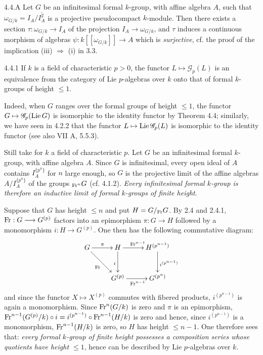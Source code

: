 \begin{remark}{4.4.A}\label{VIIB.4.4.A}
Let $G$ be an infinitesimal formal $k$-group, with affine algebra $A$, such that $\omega_{G/k}=I_A/\overline{I_A^2}$ is a projective pseudocompact $k$-module. Then there exists a section $\tau:\omega_{G/k}\to I_A$ of the projection $I_A\to\omega_{G/k}$, and $\tau$ induces a continuous morphism of algebras $\psi:k[[\omega_{G/k}]]\to A$ which is \emph{surjective}, cf. the proof of the implication (iii) $\Rightarrow$ (i) in 3.3.
\end{remark}
\begin{corollary}{4.4.1}\label{VIIB.4.4.1}
If $k$ is a field of characteristic $p>0$, the functor $L\mapsto\mathscr G_p(L)$ is an equivalence from the category of Lie $p$-algebras over $k$ onto that of formal $k$-groups of height $\le1$.
\end{corollary}
Indeed, when $G$ ranges over the formal groups of height $\le1$, the functor $G\mapsto\mathscr G_p(\operatorname{Lie} G)$ is isomorphic to the identity functor by Theorem 4.4; similarly, we have seen in 4.2.2 that the functor $L\mapsto\operatorname{Lie}\mathscr G_p(L)$ is isomorphic to the identity functor (see also VII A, 5.5.3).

Still take for $k$ a field of characteristic $p$. Let $G$ be an infinitesimal formal $k$-group, with affine algebra $A$.
Since $G$ is infinitesimal, every open ideal of $A$ contains $I_A^{\{p^n\}}$ for $n$ large enough, so $G$ is the projective limit of the affine algebras $A/I_A^{\{p^n\}}$ of the groups ${}_{\operatorname{Fr}^n}G$ (cf. 4.1.2). \emph{Every infinitesimal formal $k$-group is therefore an inductive limit of formal $k$-groups of finite height}.

Suppose that $G$ has height $\le n$ and put $H=G/{}_{\operatorname{Fr}}G$. By 2.4 and 2.4.1, $\operatorname{Fr}:G\longrightarrow G^{(p)}$ factors into an epimorphism $\pi:G\to H$ followed by a monomorphism $i:H\to G^{(p)}$. One then has the following commutative diagram:
\[
\xymatrix@C=24pt@R=28pt{
G\ar[r]^\pi\ar[dr]_{\Fr}&H\ar[r]^{\Fr^{n-1}}\ar[d]_i&H^{(p^{n-1})}\ar[d]^{i^{(p^{n-1})}}\\
&G^{(p)}\ar[r]_{\Fr^{n-1}}&G^{(p^n)}}
\]
and since the functor $X\mapsto X^{(p)}$ commutes with fibered products, $i^{(p^{n-1})}$ is again a monomorphism. Since $\operatorname{Fr}^n(G/k)$ is zero and $\pi$ is an epimorphism, $\operatorname{Fr}^{n-1}(G^{(p)}/k)\circ i=i^{(p^{n-1})}\circ\operatorname{Fr}^{n-1}(H/k)$ is zero and hence, since $i^{(p^{n-1})}$ is a monomorphism, $\operatorname{Fr}^{n-1}(H/k)$ is zero, so $H$ has height $\le n-1$. One therefore sees that: \emph{every formal $k$-group of finite height possesses a composition series whose quotients have height $\le1$}, hence can be described by Lie $p$-algebras over $k$.

